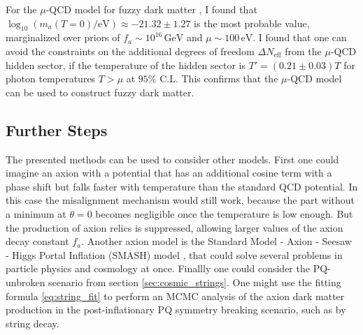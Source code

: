 \documentclass[twoside,a4paper, 12pt]{article}
\numberwithin{equation}{section}
\begin{document}
\noindent
For the $\mu$-QCD model for fuzzy dark matter \cite{microqcd}, I found that $\log_{10} (m_a(T=0) / \mathrm{eV}) \approx -21.32 \pm 1.27$
is the most probable value, marginalized over priors of $f_a \sim 10^{16} \, \mathrm{GeV}$ and $\mu \sim 100 \, \mathrm{eV}$.
I found that one can avoid the constraints on the additional degrees of freedom $\Delta N_\mathrm{eff}$ 
from the $\mu$-QCD hidden sector, if the temperature of the hidden sector is $T'= (0.21 \pm 0.03) T$ for photon temperatures $T > \mu$ at $95\%$ C.L.
This confirms that the $\mu$-QCD model can be used to construct fuzzy dark matter.

\subsection{Further Steps}
The presented methods can be used to consider other models.
First one could imagine an axion with a potential that has an additional cosine term with a phase shift
but falls faster with temperature than the standard QCD potential.
In this case the misalignment mechanism would still work, because
the part without a minimum at $\theta = 0$ becomes negligible once the temperature is low enough.
But the production of axion relics is suppressed, allowing larger values of the axion decay constant $f_a$.
Another axion model is the Standard Model - Axion - Seesaw - Higgs Portal Inflation (SMASH) model \cite{SMASH}, that could solve several problems in particle physics and cosmology
at once.
Finallly one could consider the PQ-unbroken scenario from section \ref{sec:cosmic_strings}.
One might use the fitting formula \eqref{eq:string_fit} to perform an MCMC analysis of the axion dark matter production in
the post-inflationary PQ symmetry breaking scenario, such as by string decay.


\appendix
\end{document}
